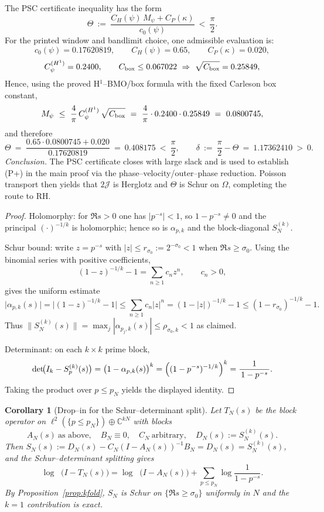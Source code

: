 \documentclass[11pt]{article}
\providecommand{\Mpsilocked}{0.0800745}%
\newtheorem{corollary}[theorem]{Corollary}
\theoremstyle{definition}
\theoremstyle{remark}
\newcommand{\C}{\mathbb{C}}
\DeclareMathOperator{\dettwo}{det_2}
\begin{document}
The PSC certificate inequality has the form
\[
\Theta\ :=\ \frac{C_H(\psi)\,M_\psi + C_P(\kappa)}{c_0(\psi)}\ <\ \frac{\pi}{2}.
\]
For the printed window and bandlimit choice, one admissible evaluation is:
\[
c_0(\psi)=0.17620819,\qquad C_H(\psi)=0.65,\qquad C_P(\kappa)=0.020,
\]
\[
C_\psi^{(H^1)}=0.2400,\qquad C_{\rm box}\le 0.067022\ \Rightarrow\ \sqrt{C_{\rm box}}=0.25849,
\]
Hence, using the proved H$^1$--BMO/box formula with the fixed Carleson box constant,
\[
M_\psi\ \le\ \frac{4}{\pi}\,C_\psi^{(H^1)}\,\sqrt{C_{\rm box}}\ =\ \frac{4}{\pi}\cdot 0.2400 \cdot 0.25849\ =\ \Mpsilocked,
\]
and therefore
\[
\Theta\ =\ \frac{0.65\cdot \Mpsilocked + 0.020}{0.17620819}\ =\ 0.408175\ <\ \frac{\pi}{2},\qquad
\delta\ :=\ \frac{\pi}{2}-\Theta\ =\ 1.17362410\ >\ 0.
\]
\emph{Conclusion.} The PSC certificate closes with large slack and is used to establish (P+) in the main proof via the phase--velocity/outer--phase reduction. Poisson transport then yields that $2\mathcal J$ is Herglotz and $\Theta$ is Schur on $\Omega$, completing the route to RH.
\begin{proof}
Holomorphy: for $\Re s>0$ one has $|p^{-s}|<1$, so $1-p^{-s}\neq 0$ and the principal $(\cdot)^{-1/k}$ is holomorphic; hence so is $\alpha_{p,k}$ and the block-diagonal $S_{N}^{(k)}$.

Schur bound: write $z=p^{-s}$ with $|z|\le r_{\sigma_0}:=2^{-\sigma_0}<1$ when $\Re s\ge \sigma_0$. Using the binomial series with positive coefficients,
\[
 (1-z)^{-1/k}-1=\sum_{n\ge 1} c_n z^n,\qquad c_n>0,
\]
gives the uniform estimate
\[
 \bigl|\alpha_{p,k}(s)\bigr|=\bigl|(1-z)^{-1/k}-1\bigr|\le \sum_{n\ge 1} c_n |z|^n
= (1-|z|)^{-1/k}-1 \le (1-r_{\sigma_0})^{-1/k}-1.
\]
Thus $\|S_{N}^{(k)}(s)\|=\max_{j}|\alpha_{p_j,k}(s)|\le \rho_{\sigma_0,k}<1$ as claimed.

Determinant: on each $k\times k$ prime block,
\[
 \det\!\bigl(I_k-S_{p}^{(k)}(s)\bigr)=\bigl(1-\alpha_{p,k}(s)\bigr)^{k}=\Bigl((1-p^{-s})^{-1/k}\Bigr)^{k}=\frac{1}{\,1-p^{-s}\,}.
\]
Taking the product over $p\le p_N$ yields the displayed identity.
\end{proof}
\begin{corollary}[Drop--in for the Schur--determinant split]
\label{cor:dropin}
Let $T_N(s)$ be the block operator on $\ell^2(\{p\le p_N\})\oplus\C^{kN}$ with blocks
\[
 A_N(s)\ \text{as above},\quad B_N\equiv 0,\quad C_N\ \text{arbitrary},\quad D_N(s):=S_{N}^{(k)}(s).
\]
Then $S_N(s):=D_N(s)-C_N(I-A_N(s))^{-1}B_N=D_N(s)=S_{N}^{(k)}(s)$, and the Schur--determinant splitting gives
\[
 \log\dettwo\bigl(I-T_N(s)\bigl)=\log\dettwo\bigl(I-A_N(s)\bigr)+\sum_{p\le p_N}\log\!\frac{1}{1-p^{-s}}.
\]
By Proposition~\ref{prop:kfold}, $S_N$ is Schur on $\{\Re s\ge \sigma_0\}$ uniformly in $N$ and the $k=1$ contribution is exact.
\end{corollary}
\end{document}
